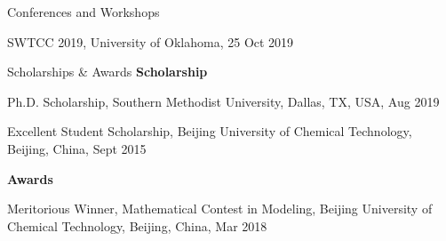 \documentclass{resume} %
\begin{document}


\begin{rSection}{Conferences and Workshops}

SWTCC 2019, University of Oklahoma, 25 Oct 2019

\end{rSection}


\begin{rSection}{Scholarships \& Awards}
{\bf Scholarship} \hfill \hfill

Ph.D. Scholarship, Southern Methodist University, Dallas, TX, USA, Aug 2019

Excellent Student Scholarship, Beijing University of Chemical Technology, Beijing, China, Sept 2015

{\bf Awards} \hfill \hfill

Meritorious Winner, Mathematical Contest in Modeling, Beijing University of Chemical Technology, Beijing, China, Mar 2018
\end{rSection}



%
%
%
\end{document}
